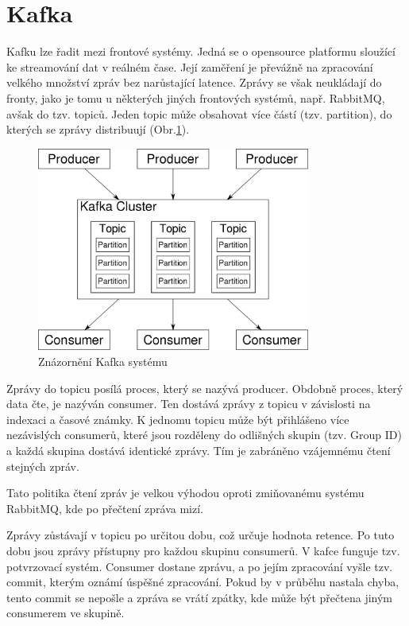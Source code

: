 \documentclass[thesis=M,czech,hidelinks]{FITthesis}[2013/05/06]
\begin{document}
\section{Kafka}\label{sec:kafka}
Kafku lze řadit mezi frontové systémy. Jedná se o opensource platformu sloužící ke streamování dat v reálném čase. Její zaměření je převážně na zpracování velkého množství zpráv bez narůstající latence. Zprávy se však neukládají do fronty, jako je tomu u některých jiných frontových systémů, např. RabbitMQ, avšak do tzv. topiců. Jeden topic může obsahovat více částí (tzv. partition), do kterých se zprávy distribuují (Obr.\ref{fig:kafka}). 
\begin{figure}[h]
	\centering
	\includegraphics[width=9cm]{pictures/kafka.png}
	\caption{Znázornění Kafka systému \cite{kafka}}
	\label{fig:kafka}
\end{figure}
Zprávy do topicu posílá proces, který se nazývá producer. Obdobně proces, který data čte, je nazýván consumer. Ten dostává zprávy z topicu v závislosti na indexaci a časové známky. K jednomu topicu může být přihlášeno více nezávislých consumerů, které jsou rozděleny do odlišných skupin (tzv. Group ID) a každá skupina dostává identické zprávy. Tím je zabráněno vzájemnému čtení stejných zpráv.

Tato politika čtení zpráv je velkou výhodou oproti zmiňovanému systému RabbitMQ, kde po přečtení zpráva mizí. 

Zprávy zůstávají v topicu po určitou dobu, což určuje hodnota retence. Po tuto dobu jsou zprávy přístupny pro každou skupinu consumerů. V kafce funguje tzv. potvrzovací systém. Consumer dostane zprávu, a po jejím zpracování vyšle tzv. commit, kterým oznámí úspěšné zpracování. Pokud by v průběhu nastala chyba, tento commit se nepošle a zpráva se vrátí zpátky, kde může být přečtena jiným consumerem ve skupině.
\end{document}
